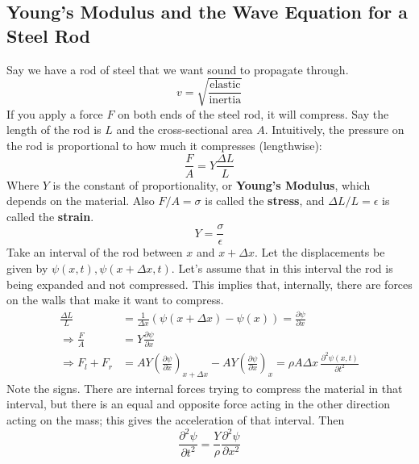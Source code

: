 \documentclass{report}
\numberwithin{equation}{section}
\newcommand{\pd}[2]{\frac{\partial #1}{\partial #2}}
\newcommand{\pdd}[2]{\frac{\partial^2 #1}{\partial #2^2}}
\begin{document}
\subsection{Young's Modulus and the Wave Equation for a Steel Rod}
Say we have a rod of steel that we want sound to propagate through.
\begin{equation}
	v = \sqrt{\frac{\text{elastic}}{\text{inertia}}}
\end{equation}
If you apply a force $F$ on both ends of the steel rod, it will compress. Say the length of the rod is $L$ and the cross-sectional area $A$. Intuitively, the pressure on the rod is proportional to how much it compresses (lengthwise):
\begin{equation}
	\frac{F}{A} = Y\frac{\Delta L}{L}
\end{equation}
Where $Y$ is the constant of proportionality, or \textbf{Young's Modulus}, which depends on the material. Also $F/A = \sigma$ is called the \textbf{stress}, and $\Delta L/L = \epsilon$ is called the \textbf{strain}.
\begin{equation}
	Y = \frac{\sigma}{\epsilon}
\end{equation}
Take an interval of the rod between $x$ and $x+\Delta x$. Let the displacements be given by $\psi(x,t),\psi(x+\Delta x,t)$. Let's assume that in this interval the rod is being expanded and not compressed. This implies that, internally, there are forces on the walls that make it want to compress.
\begin{align*}
	\frac{\Delta L}{L} &= \frac{1}{\Delta x}\left(\psi(x+\Delta x) - \psi(x)\right)= \pd{\psi}{x}\\
	\Rightarrow \frac{F}{A} &= Y\pd{\psi}{x}\\
	\Rightarrow F_{l} + F_{r} &=A Y\left(\pd{\psi}{x}\right)_{x+\Delta x} - AY \left(\pd{\psi}{x}\right)_{x}=\rho A \Delta x\,\pdd{\psi(x,t)}{t}
\end{align*}
Note the signs. There are internal forces trying to compress the material in that interval, but there is an equal and opposite force acting in the other direction acting on the mass; this gives the acceleration of that interval. Then
\begin{equation}
	\pdd{\psi}{t}=\frac{Y}{\rho}\pdd{\psi}{x}
\end{equation}
\end{document}
